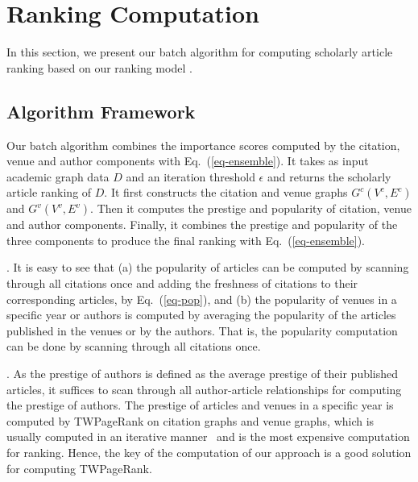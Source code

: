 \section{Ranking Computation}
\label{sec-alg}

In this section, we present our batch algorithm for computing scholarly article ranking based on our ranking model \ensemblerank.

\subsection{Algorithm Framework}
\label{subsec-bat-alg}

Our batch algorithm \batensemble  combines the importance scores computed by the citation, venue and author components with Eq.~(\ref{eq-ensemble}). It takes as input academic graph data $D$ and an iteration threshold $\epsilon$ and returns the scholarly article ranking of $D$. It first constructs the citation and venue graphs $G^c(V^c,E^c)$ and $G^v(V^v,E^v)$. Then it computes the prestige and popularity of citation, venue and author components.
Finally, it combines the  prestige and popularity of the three components to produce the final ranking with Eq.~(\ref{eq-ensemble}).



. It is easy to see that (a) the popularity of articles can be computed by scanning through all citations once and adding the freshness of citations to their corresponding articles, by Eq.~(\ref{eq-pop}), and (b) the popularity of venues in a specific year or authors is computed by averaging the popularity of the articles published in the venues or by the authors.
That is, the popularity computation can be done by scanning through all citations once.


. As the prestige of authors is defined as the average prestige of their published articles, it suffices to scan through all author-article  relationships for computing the prestige of authors. The prestige of  articles and venues in a specific year is computed by TWPageRank on citation graphs and venue graphs, which is usually computed in an iterative manner~\cite{Brin98:PageRank} and is the most expensive computation for ranking. Hence, the key of the computation of our approach is a good solution for computing TWPageRank.






